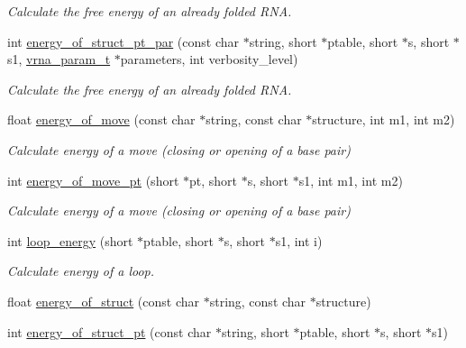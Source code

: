 \begin{DoxyCompactItemize}
\begin{DoxyCompactList}\small\item\em Calculate the free energy of an already folded R\+NA. \end{DoxyCompactList}\item 
int \mbox{\hyperlink{group__eval__deprecated_ga49acb3d5627dc6823a7ce12d116d4c69}{energy\+\_\+of\+\_\+struct\+\_\+pt\+\_\+par}} (const char $\ast$string, short $\ast$ptable, short $\ast$s, short $\ast$s1, \mbox{\hyperlink{group__energy__parameters_ga8a69ca7d787e4fd6079914f5343a1f35}{vrna\+\_\+param\+\_\+t}} $\ast$parameters, int verbosity\+\_\+level)
\begin{DoxyCompactList}\small\item\em Calculate the free energy of an already folded R\+NA. \end{DoxyCompactList}\item 
float \mbox{\hyperlink{group__eval__deprecated_ga539ecaed89730f7644c202f304d7529b}{energy\+\_\+of\+\_\+move}} (const char $\ast$string, const char $\ast$structure, int m1, int m2)
\begin{DoxyCompactList}\small\item\em Calculate energy of a move (closing or opening of a base pair) \end{DoxyCompactList}\item 
int \mbox{\hyperlink{group__eval__deprecated_ga49e0ee561be69faf0568213546f6a53f}{energy\+\_\+of\+\_\+move\+\_\+pt}} (short $\ast$pt, short $\ast$s, short $\ast$s1, int m1, int m2)
\begin{DoxyCompactList}\small\item\em Calculate energy of a move (closing or opening of a base pair) \end{DoxyCompactList}\item 
int \mbox{\hyperlink{group__eval__deprecated_ga507d4fd93f4b398d793ba2402731388d}{loop\+\_\+energy}} (short $\ast$ptable, short $\ast$s, short $\ast$s1, int i)
\begin{DoxyCompactList}\small\item\em Calculate energy of a loop. \end{DoxyCompactList}\item 
float \mbox{\hyperlink{group__eval__deprecated_gac2b37fea2145c94d925a3f33378ef87b}{energy\+\_\+of\+\_\+struct}} (const char $\ast$string, const char $\ast$structure)
\item 
int \mbox{\hyperlink{group__eval__deprecated_ga27ce6f68512d43bf1fe14a06c9d76d5c}{energy\+\_\+of\+\_\+struct\+\_\+pt}} (const char $\ast$string, short $\ast$ptable, short $\ast$s, short $\ast$s1)

\end{DoxyCompactItemize}
